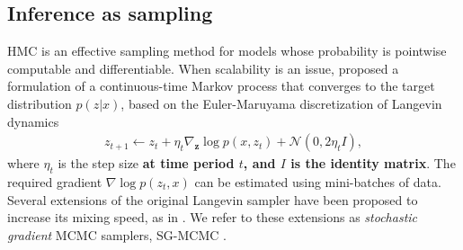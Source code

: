 
\subsection{Inference as sampling}

HMC \cite{neal2011mcmc} is an effective sampling method for models whose probability is pointwise computable and differentiable. %
When scalability is an issue, \cite{welling2011bayesian} proposed a formulation of a continuous-time Markov process that converges to
the target distribution $p(z | x)$, 
based on the Euler-Maruyama discretization of Langevin dynamics
\begin{eqnarray}\label{eq:sgmcmc}
z_{t+1} \leftarrow z_{t} + \eta_t \nabla_{\bm{z}} \log p(x, z_t)  + \mathcal{N}(0, 2\eta_t I),
\end{eqnarray}
where $\eta_t$ is the step size {\bf at time period
$t$, and $I$ is the identity matrix}. The 
required gradient $\nabla \log p(z_t,x)$ can be estimated using mini-batches of data. Several extensions of the original Langevin sampler have been proposed to increase its mixing speed, 
as in 
\cite{li2016preconditioned,li2016high,abbati2018adageo,gallego2018stochastic}. We refer to these extensions as \emph{stochastic gradient} MCMC samplers, SG-MCMC \cite{ma2015complete}.








